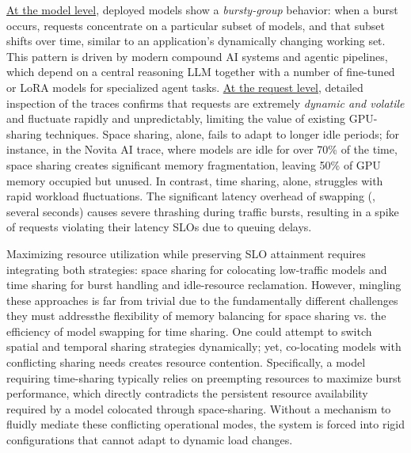  \underline{At the model level}, deployed models show a \emph{bursty-group} behavior: when a burst occurs, requests concentrate on a particular subset of models, and that subset shifts over time, similar to an application’s dynamically changing working set. This pattern is driven by modern compound AI systems and agentic pipelines, which depend on a central reasoning LLM together with a number of fine-tuned or LoRA models for specialized agent tasks. \underline{At the request level}, detailed inspection of the traces confirms that requests are extremely \emph{dynamic and volatile} and fluctuate rapidly and unpredictably, limiting the value of existing GPU-sharing techniques. 
Space sharing, alone, fails to adapt to longer idle periods; for instance, in the Novita AI trace, where models are idle for over 70\% of the time, space sharing creates significant memory fragmentation, leaving 50\% of GPU memory occupied but unused. In contrast, time sharing, alone, struggles with rapid workload fluctuations. The significant latency overhead of swapping (\eg, several seconds) causes severe thrashing during traffic bursts, resulting in a spike of requests violating their latency SLOs due to queuing delays. 

Maximizing resource utilization while preserving SLO attainment requires integrating both strategies: space sharing for colocating low-traffic models and time sharing for burst handling and idle-resource reclamation. However, mingling these approaches is far from trivial due to the fundamentally different challenges they must address\textemdash the flexibility of memory balancing for space sharing vs. the efficiency of model swapping for time sharing. 
One could attempt to switch spatial and temporal sharing strategies dynamically;
yet, co-locating models with conflicting sharing needs creates resource contention. Specifically, a model requiring time-sharing typically relies on preempting resources to maximize burst performance, which directly contradicts the persistent resource availability required by a model colocated through space-sharing. Without a mechanism to fluidly mediate these conflicting operational modes, the system is forced into rigid configurations that cannot adapt to dynamic load changes.

